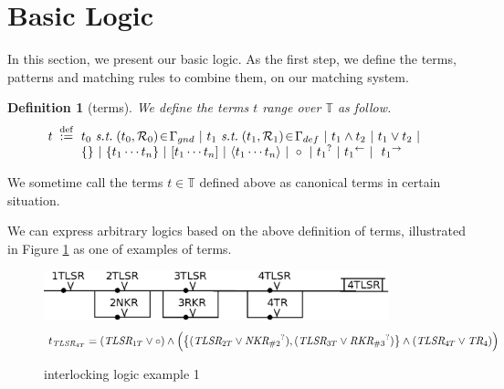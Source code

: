 \documentclass[12pt]{article}
\newtheorem{Definition}{Definition}[section]
\begin{document}
\section{Basic Logic}
In this section, we present our basic logic. As the first step, we define
the terms, patterns and matching rules to combine them, on our matching
system.

\begin{Definition}[terms]
  We define the terms $t$ range over $\mathbb{T}$ as follow.
  \[ t \;\stackrel{\mathrm{def}}{:=}\!
      \begin{array}[t]{l}
             t_0 \ \text{\it s.t.}\; (t_0, \mathcal{R}_0) \!\in\!
              \Gamma_{gnd}\ |\ 
             t_1 \ \text{\it s.t.}\; (t_1, \mathcal{R}_1) \!\in\!
              \Gamma_{def}\ |\
             t_1 \wedge t_2
        \ |\ t_1 \vee t_2 \ |  \\
        \{\} \ |\ \{t_1 \cdots t_n \}
        \ |\ [t_1 \cdots t_n ]
        \ |\ \langle t_1 \cdots t_n \rangle \ |\
        \circ \ |\  {t_1}^? \ |\ {t_1}^{\leftarrow} \ |\
        \ {t_1}^{\rightarrow} 
      \end{array}
  \]
\end{Definition}

We sometime call the terms $t \in \mathbb{T}$ defined above as canonical
terms in certain situation.

We can express arbitrary logics based on the above definition of terms,
illustrated in Figure \ref{fig_of_instance_ex1} as one of examples of
terms.

\begin{figure}[htbp]
  \begin{center}
    \includegraphics[keepaspectratio, width=100mm]{fig1.eps}
    \begin{displaymath}
      t_{\text{\it TLSR}_{4T}} =
      (\text{\it TLSR}_{1T} \vee \circ) \wedge
      \Bigl(\bigl\{(\text{\it TLSR}_{2T} \vee
      {\text{\it NKR}_{\#2}}^?), (\text{\it TLSR}_{3T} \vee
      {\text{\it RKR}_{\#3}}^?)\bigr\} \wedge (\text{\it TLSR}_{4T} \vee
      \text{\it TR}_{4}) \Bigr)
    \end{displaymath}
    \caption{interlocking logic example 1}
    \label{fig_of_instance_ex1}
  \end{center}
\end{figure}
\end{document}
